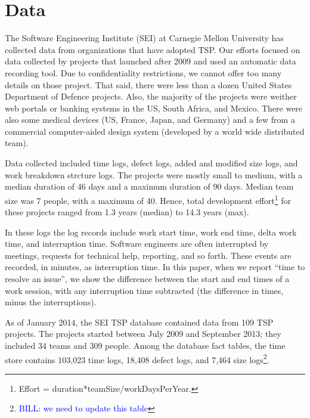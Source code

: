 \documentclass{sig-alternate}
\newcommand{\bill}[1]{\textcolor{blue}{BILL: #1}}
\begin{document}
\section{Data}

The Software Engineering Institute (SEI) at
Carnegie Mellon University has collected data from organizations
that have adopted TSP. 
Our efforts focused on data collected by projects that launched
after 2009 and used an automatic data recording tool. 
Due to confidentiality restrictions, we cannot offer too many details
on those project. That said, there were less than a dozen United States
Department of Defence projects. Also, the majority of
the projects were weither web portals or banking systems in the US, South Africa, and Mexico. 
There were also some  medical devices (US, France, Japan, and Germany) and a few from a commercial 
computer-aided design system (developed by a world wide distributed team). 


Data collected included time logs, defect
logs, added and modified size logs, and work
breakdown strcture logs.
The projects
were mostly small to medium, with a median duration of 46 days
and a maximum duration of 90 days. Median team size was 7
people, with a maximum of 40. Hence,  total development 
effort\footnote{
Effort =  duration*teamSize/workDaysPerYear.} for
these projects ranged from 1.3 years (median) to 14.3 years (max).

In these logs
the log records include work start time, work end time, delta
work time, and interruption time. Software engineers are often
interrupted by meetings, requests for technical help, reporting, and
so forth. These events are recorded, in minutes, as interruption
time. In this paper, when we report ``time to resolve an
issue'', we show the difference between the start and end times
of a work session, with any interruption time subtracted (the
difference in times, minus the interruptions).  

As of January 2014, the SEI TSP database contained data from 109
TSP projects. The projects started between July 2009 and
September 2013; they included 34 teams and 309 people. Among
the database fact tables, the time store contains 103,023 time logs,
18,408 defect logs, and 7,464 size logs\footnote{\bill{we need to 
update this table}}.  
\end{document}
